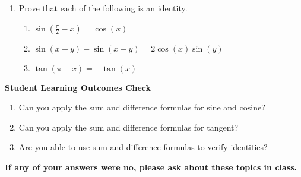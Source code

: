 \begin{enumerate}
\item Prove that each of the following is an identity.

\begin{enumerate}
\item $\sin \left(\frac{\pi}{2}-x\right)=\cos(x)$
\vfill

\item $\sin(x+y)-\sin(x-y) = 2 \cos\left(x\right) \sin(y)$
\vfill

\item $\tan(\pi-x)=-\tan(x)$
\vfill


\end{enumerate}



\end{enumerate}

\noindent \textbf{Student Learning Outcomes Check}

\begin{enumerate}
\item Can you apply the sum and difference formulas for sine and cosine?
\item Can you apply the sum and difference formulas for tangent?
\item Are you able to use sum and difference formulas to verify identities?
\end{enumerate}

\noindent \textbf{If any of your answers were no, please ask about these topics in class.}


